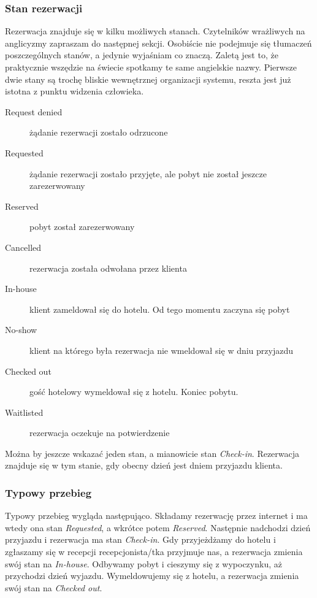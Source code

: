 \documentclass[a4paper,onecolumn,oneside,11pt,wide,floatssmall]{mwrep}
\theoremstyle{definition}
\theoremstyle{plain}%
\theoremstyle{remark}
\begin{document}
\subsubsection{Stan rezerwacji}
Rezerwacja znajduje się w kilku możliwych stanach. Czytelników wrażliwych na
anglicyzmy zapraszam do następnej sekcji. Osobiście nie podejmuje się tłumaczeń
poszczególnych stanów, a jedynie wyjaśniam co znaczą. Zaletą jest to, że
praktycznie wszędzie na świecie spotkamy te same angielskie nazwy. Pierwsze dwie
stany są trochę bliskie wewnętrznej organizacji systemu, reszta jest już istotna
z punktu widzenia człowieka.

\begin{description}
\item[Request denied] żądanie rezerwacji zostało odrzucone
\item[Requested] żądanie rezerwacji zostało przyjęte, ale pobyt nie został
jeszcze zarezerwowany
\item[Reserved] pobyt został zarezerwowany
\item[Cancelled] rezerwacja została odwołana przez klienta
\item[In-house] klient zameldował się do hotelu. Od tego momentu zaczyna się
pobyt
\item[No-show] klient na którego była rezerwacja nie wmeldował się w dniu
przyjazdu
\item[Checked out] gość hotelowy wymeldował się z hotelu. Koniec pobytu.
\item[Waitlisted] rezerwacja oczekuje na potwierdzenie
\end{description}

Można by jeszcze wskazać jeden stan, a mianowicie stan \emph{Check-in}.
Rezerwacja znajduje się w tym stanie, gdy obecny dzień jest dniem przyjazdu
klienta.

\subsubsection{Typowy przebieg}
Typowy przebieg wygląda następująco. Składamy rezerwację przez internet i ma
wtedy ona stan \emph{Requested}, a wkrótce potem \emph{Reserved}. Następnie
nadchodzi dzień przyjazdu i rezerwacja ma stan \emph{Check-in}. Gdy przyjeżdżamy
do hotelu i zgłaszamy się w recepcji recepcjonista/tka przyjmuje nas, a
rezerwacja zmienia swój stan na \emph{In-house}. Odbywamy pobyt i cieszymy się z
wypoczynku, aż przychodzi dzień wyjazdu. Wymeldowujemy się z hotelu, a
rezerwacja zmienia swój stan na \emph{Checked out}.
\end{document}

